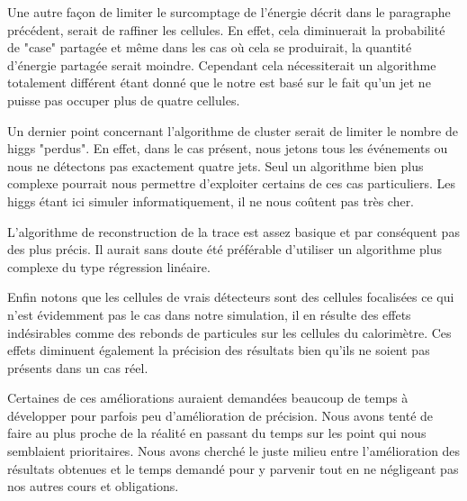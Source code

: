 \documentclass[11pt]{article}
\begin{document}
Une autre façon de limiter le surcomptage de l'énergie décrit dans le paragraphe précédent, serait de raffiner les 
cellules. En effet, cela diminuerait la probabilité de "case" partagée et même dans les cas où cela se produirait, la
quantité d'énergie partagée serait moindre. Cependant cela nécessiterait un
algorithme totalement différent
étant donné que le notre est basé sur le fait qu'un jet ne puisse pas occuper
plus de quatre cellules.

Un dernier point concernant l'algorithme de cluster serait de limiter le nombre
de higgs "perdus". En effet, dans le cas présent, nous jetons tous les
événements ou nous ne détectons pas exactement quatre jets. Seul un algorithme
bien plus complexe pourrait nous permettre d'exploiter certains de ces cas
particuliers. Les higgs étant ici simuler informatiquement, il ne nous coûtent
pas très cher.

L'algorithme de reconstruction de la trace est assez basique et par conséquent
pas des plus précis. Il aurait sans doute
été préférable d'utiliser un algorithme plus complexe du type régression linéaire.


Enfin notons que les cellules de vrais d\'etecteurs sont des cellules focalisées ce qui n'est évidemment pas le 
cas dans notre simulation, il en résulte des effets indésirables comme des rebonds de particules sur les cellules du
calorimètre. Ces effets diminuent également la précision des résultats bien qu'ils ne soient pas présents dans un cas réel.



Certaines de ces améliorations auraient demandées beaucoup de temps à
développer pour parfois peu d'amélioration de précision. Nous avons tenté de
faire au plus proche de la réalité en passant du temps sur les point qui nous
semblaient prioritaires. Nous avons cherché le juste milieu entre l'amélioration
des résultats obtenues et le temps demandé pour y parvenir tout en ne négligeant
pas nos autres cours et obligations.


		
\end{document}
